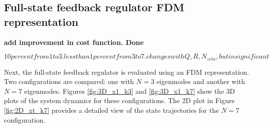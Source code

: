 \subsection{Full-state feedback regulator FDM representation}

\textbf{add improvement in cost function. Done}

\begin{equation*}
    10 percent from 1 to 3. less than 1 percent from 3 to 7. changes with Q, R, N_{zeta}, but insignificant
\end{equation*}


Next, the full-state feedback regulator is evaluated using an FDM representation. Two configurations are compared: one with $N=3$ eigenmodes and another with $N=7$ eigenmodes. Figures \ref{fig:3D_x1_k3} and \ref{fig:3D_x1_k7} show the 3D plots of the system dynamics for these configurations. The 2D plot in Figure \ref{fig:2D_xt_k7} provides a detailed view of the state trajectories for the $N=7$ configuration.

